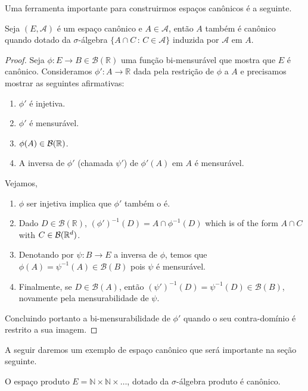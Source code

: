 Uma ferramenta importante para construirmos espaços canônicos é a seguinte.

\begin{lemma}
  \label{l:mensur_de_canonico}
  Seja $(E, \mathcal{A})$ é um espaço canônico e $A \in \mathcal{A}$, então $A$ também é canônico quando dotado da $\sigma$-álgebra $\{A \cap C\, : \, C \in \mathcal{A}\}$ induzida por $\mathcal{A}$ em $A$.
\end{lemma}

\begin{proof}
  Seja $\phi: E \to B \in \mathcal{B}(\mathbb{R})$ uma função bi-mensurável que mostra que $E$ é canônico.
  Consideramos $\phi': A \to \mathbb{R}$ dada pela restrição de $\phi$ a $A$ e precisamos mostrar as seguintes afirmativas:
  \begin{enumerate}[\quad a)]
  \item $\phi'$ é injetiva.
  \item $\phi'$ é mensurável.
  \item $\phi(A)\in {\ensuremath{\mathcal B}}({\mathbb R})$.
  \item A inversa de $\phi'$ (chamada $\psi'$) de $\phi'(A)$ em $A$ é mensurável.
  \end{enumerate}
  Vejamos,
  \begin{enumerate}[\quad a)]
  \item $\phi$ ser injetiva implica que $\phi'$ também o é.
  \item Dado $D \in \mathcal{B}(\mathbb{R})$, $(\phi')^{-1}(D) = A \cap \phi^{-1}(D)$ which is of the form $A\cap C$ with $C\in {\ensuremath{\mathcal B}}({\mathbb R}^d)$.
  \item Denotando por $\psi: B \to E$ a inversa de $\phi$, temos que $\phi(A) = \psi^{-1}(A) \in \mathcal{B}(B)$ pois $\psi$ é mensurável.
  \item Finalmente, se $D \in \mathcal{B}(A)$, então $(\psi')^{-1}(D) = \psi^{-1}(D) \in \mathcal{B}(B)$, novamente pela mensurabilidade de $\psi$.
  \end{enumerate}
  Concluindo portanto a bi-mensurabilidade de $\phi'$ quando o seu contra-domínio é restrito a sua imagem.
\end{proof}

A seguir daremos um exemplo de espaço canônico que será importante na seção seguinte.

\begin{lemma}
  \label{l:NN_canonico}
  O espaço produto $E = \mathbb{N} \times \mathbb{N} \times \dots$, dotado da $\sigma$-álgebra produto é canônico.
\end{lemma}

